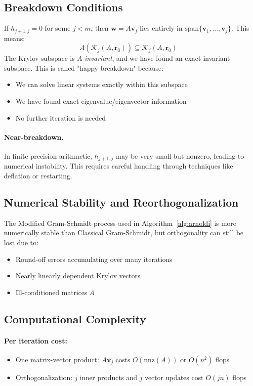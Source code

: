 \documentclass[../../main.tex]{subfiles}
\begin{document}
\subsection{Breakdown Conditions}
If $h_{j+1,j} = 0$ for some $j < m$, then $\mathbf{w} = A\mathbf{v}_j$ lies entirely in $\text{span}\{\mathbf{v}_1, \ldots, \mathbf{v}_j\}$. This means:
\[
  A(\mathcal{K}_j(A,\mathbf{r}_0)) \subseteq \mathcal{K}_j(A,\mathbf{r}_0)
\]
The Krylov subspace is \emph{$A$-invariant}, and we have found an exact invariant subspace. This is called "happy breakdown" because:
\begin{itemize}
  \item We can solve linear systems exactly within this subspace
  \item We have found exact eigenvalue/eigenvector information
  \item No further iteration is needed
\end{itemize}

\paragraph{Near-breakdown.}
In finite precision arithmetic, $h_{j+1,j}$ may be very small but nonzero, leading to numerical instability. This requires careful handling through techniques like deflation or restarting.

\subsection{Numerical Stability and Reorthogonalization}
The Modified Gram-Schmidt process used in Algorithm~\ref{alg:arnoldi} is more numerically stable than Classical Gram-Schmidt, but orthogonality can still be lost due to:
\begin{itemize}
  \item Round-off errors accumulating over many iterations
  \item Nearly linearly dependent Krylov vectors
  \item Ill-conditioned matrices $A$
\end{itemize}

\subsection{Computational Complexity}

\paragraph{Per iteration cost:}
\begin{itemize}
  \item One matrix-vector product: $A\mathbf{v}_j$ costs $O(\text{nnz}(A))$ or $O(n^2)$ flops
  \item Orthogonalization: $j$ inner products and $j$ vector updates cost $O(jn)$ flops
\end{itemize}
\end{document}
